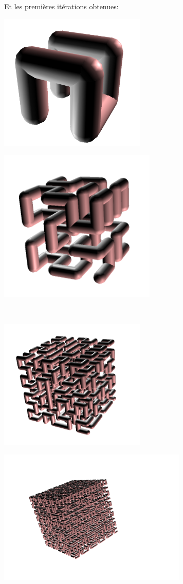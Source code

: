 Et les premières itérations obtenues:
\begin{center}
\begin{minipage}{7cm}
 \includegraphics[width=7cm]{images/linden-hilbert1.png}
\end{minipage}
\begin{minipage}{7cm}
 \includegraphics[width=7.5cm]{images/linden-hilbert2.png}
\end{minipage}\\
\begin{minipage}{7cm}
 \includegraphics[width=7cm]{images/linden-hilbert3.png}
\end{minipage}
\begin{minipage}{7cm}
 \includegraphics[width=9cm]{images/linden-hilbert4.png}
\end{minipage}
\end{center}